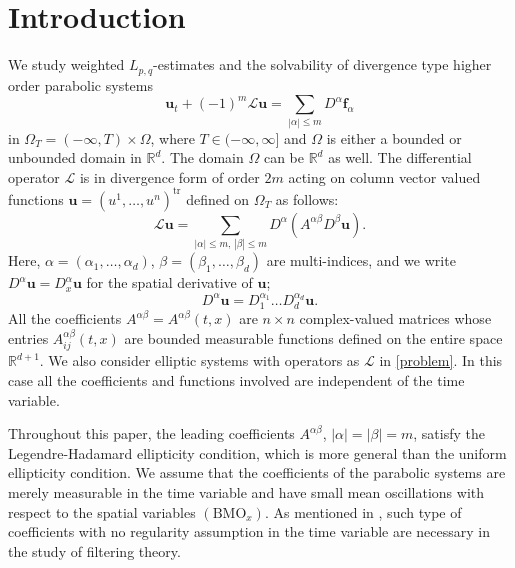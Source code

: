 \documentclass[reqno]{amsart}
\numberwithin{equation}{section}
\theoremstyle{plain}
\theoremstyle{definition}
\theoremstyle{remark}
\begin{document}
\section{Introduction}
We study weighted $L_{p,q}$-estimates and the solvability of divergence type higher order parabolic systems
\begin{equation}		\label{problem}
{\boldsymbol{u}}_t+(-1)^m{\mathcal{L}}{\boldsymbol{u}}=\sum_{|\alpha|\le m} D^\alpha {\boldsymbol{f}}_\alpha 
\end{equation}
in $\Omega_T=(-\infty,T)\times \Omega$, where $T\in (-\infty,\infty]$ and $\Omega$ is either a bounded or unbounded domain in ${\mathbb{R}}^d$.
The domain $\Omega$ can be ${\mathbb{R}}^d$ as well.
The differential operator ${\mathcal{L}}$ is in divergence form of order $2m$ acting on column vector valued functions ${\boldsymbol{u}}=(u^1,\ldots,u^n)^{\operatorname{tr}}$ defined on $\Omega_T$ as follows:
\[
{\mathcal{L}}{\boldsymbol{u}}=\sum_{|\alpha|
\le m,\, |\beta| \le m}D^{\alpha}(A^{\alpha\beta}D^\beta{\boldsymbol{u}}).
\] 
Here, $\alpha=(\alpha_1,\ldots,\alpha_d)$, $\beta=(\beta_1,\ldots,\beta_d)$ are multi-indices,  and we write $D^\alpha {\boldsymbol{u}}=D_x^\alpha {\boldsymbol{u}}$ for the spatial derivative of ${\boldsymbol{u}}$;
\[
D^\alpha{\boldsymbol{u}}=D^{\alpha_1}_1\ldots D^{\alpha_d}_d{\boldsymbol{u}}.
\]
All the coefficients $A^{\alpha\beta}=A^{\alpha\beta}(t,x)$ are  $n\times n$ complex-valued matrices whose entries $A^{\alpha\beta}_{ij}(t,x)$ are bounded measurable functions defined on the entire space ${\mathbb{R}}^{d+1}$.
We also consider elliptic systems with operators as ${\mathcal{L}}$ in \eqref{problem}.
In this case all the coefficients and functions involved are independent of the time variable.

Throughout this paper,  the leading coefficients $A^{\alpha\beta}$, $|\alpha|=|\beta|=m$, satisfy the Legendre-Hadamard ellipticity condition, which is more general than the uniform ellipticity condition.
We assume that the coefficients of the parabolic systems are merely measurable in the time variable and have small mean oscillations with respect to the spatial variables $({\mathrm{BMO}}_x)$.
As mentioned in \cite{MR1828321},  such type of coefficients with no regularity assumption in the time variable are necessary in the study of filtering theory.
\end{document}
